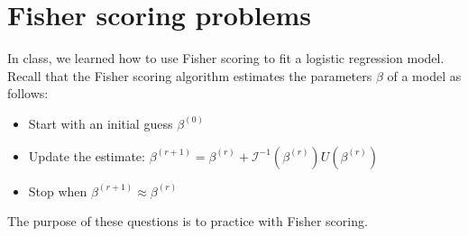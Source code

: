 \documentclass[11pt]{article}
\begin{document}
\section*{Fisher scoring problems}

In class, we learned how to use Fisher scoring to fit a logistic regression model. Recall that the Fisher scoring algorithm estimates the parameters $\beta$ of a model as follows:

\begin{itemize}
\item Start with an initial guess $\beta^{(0)}$
\item Update the estimate: $\beta^{(r+1)} = \beta^{(r)} + \mathcal{I}^{-1}(\beta^{(r)}) U(\beta^{(r)})$
\item Stop when $\beta^{(r+1)} \approx \beta^{(r)}$
\end{itemize}

\noindent The purpose of these questions is to practice with Fisher scoring.\\
\end{document}
